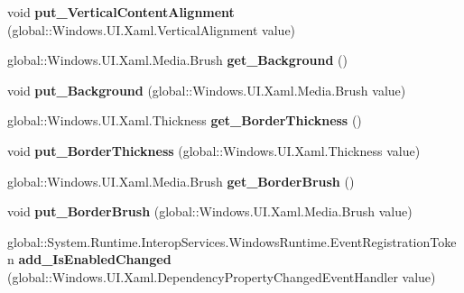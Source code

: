 \begin{DoxyCompactItemize}
void {\bfseries put\+\_\+\+Vertical\+Content\+Alignment} (global\+::\+Windows.\+U\+I.\+Xaml.\+Vertical\+Alignment value)
\item 
\mbox{\label{interface_windows_1_1_u_i_1_1_xaml_1_1_controls_1_1_i_control_aac29873ebb350b3b04070ed6664351eb}} 
global\+::\+Windows.\+U\+I.\+Xaml.\+Media.\+Brush {\bfseries get\+\_\+\+Background} ()
\item 
\mbox{\label{interface_windows_1_1_u_i_1_1_xaml_1_1_controls_1_1_i_control_a3ff4d65a6273f87cf0e2f0258e70a641}} 
void {\bfseries put\+\_\+\+Background} (global\+::\+Windows.\+U\+I.\+Xaml.\+Media.\+Brush value)
\item 
\mbox{\label{interface_windows_1_1_u_i_1_1_xaml_1_1_controls_1_1_i_control_a368b66c8a1f1040880bdefc07e7cb85b}} 
global\+::\+Windows.\+U\+I.\+Xaml.\+Thickness {\bfseries get\+\_\+\+Border\+Thickness} ()
\item 
\mbox{\label{interface_windows_1_1_u_i_1_1_xaml_1_1_controls_1_1_i_control_ab6fd6e86f54e793f12961312b55b372f}} 
void {\bfseries put\+\_\+\+Border\+Thickness} (global\+::\+Windows.\+U\+I.\+Xaml.\+Thickness value)
\item 
\mbox{\label{interface_windows_1_1_u_i_1_1_xaml_1_1_controls_1_1_i_control_a1abfbeb7516aaa3813e93972e9cd5675}} 
global\+::\+Windows.\+U\+I.\+Xaml.\+Media.\+Brush {\bfseries get\+\_\+\+Border\+Brush} ()
\item 
\mbox{\label{interface_windows_1_1_u_i_1_1_xaml_1_1_controls_1_1_i_control_a4c2d7d5305d305b773e5ad689a8890bd}} 
void {\bfseries put\+\_\+\+Border\+Brush} (global\+::\+Windows.\+U\+I.\+Xaml.\+Media.\+Brush value)
\item 
\mbox{\label{interface_windows_1_1_u_i_1_1_xaml_1_1_controls_1_1_i_control_a37411d40405261227231f8142b22f8e0}} 
global\+::\+System.\+Runtime.\+Interop\+Services.\+Windows\+Runtime.\+Event\+Registration\+Token {\bfseries add\+\_\+\+Is\+Enabled\+Changed} (global\+::\+Windows.\+U\+I.\+Xaml.\+Dependency\+Property\+Changed\+Event\+Handler value)

\end{DoxyCompactItemize}
